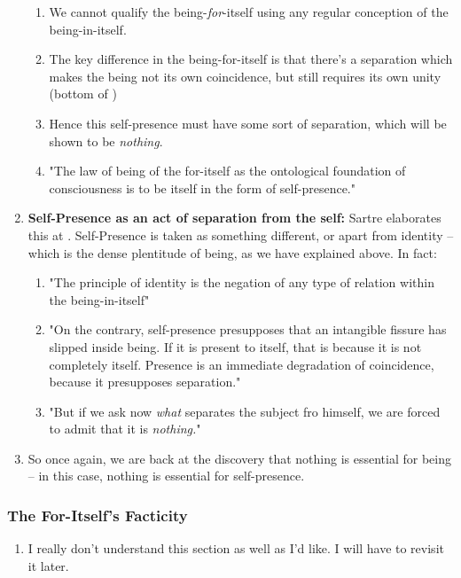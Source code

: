 \begin{enumerate}
\begin{enumerate}
    \item We cannot qualify the being-\emph{for}-itself using any regular conception of the being-in-itself.
    \item The key difference in the being-for-itself is that there's a separation which makes the being not its own coincidence, but still requires its own unity (bottom of \autocite[126]{sartre})
    \item Hence this self-presence must have some sort of separation, which will be shown to be \emph{nothing}.
    \item "The law of being of the for-itself as the ontological foundation of consciousness is to be itself in the form of self-presence." \autocite[126]{sartre}
  \end{enumerate}
  \item \textbf{Self-Presence as an act of separation from the self:} Sartre elaborates this at \autocite[127]{sartre}. Self-Presence is taken as something different, or apart from identity -- which is the dense plentitude of being, as we have explained above. In fact:
  \begin{enumerate}
    \item "The principle of identity is the negation of any type of relation within the being-in-itself"
    \item "On the contrary, self-presence presupposes that an intangible fissure has slipped inside being. If it is present to itself, that is because it is not completely itself. Presence is an immediate degradation of coincidence, because it presupposes separation."
    \item "But if we ask now \emph{what} separates the subject fro himself, we are forced to admit that it is \emph{nothing.}" \autocite[127]{sartre}
  \end{enumerate}
  \item So once again, we are back at the discovery that nothing is essential for being -- in this case, nothing is essential for self-presence.
\end{enumerate}

\subsubsection{The For-Itself's Facticity}

\begin{enumerate}
  \item I really don't understand this section as well as I'd like. I will have to revisit it later.
\end{enumerate}

